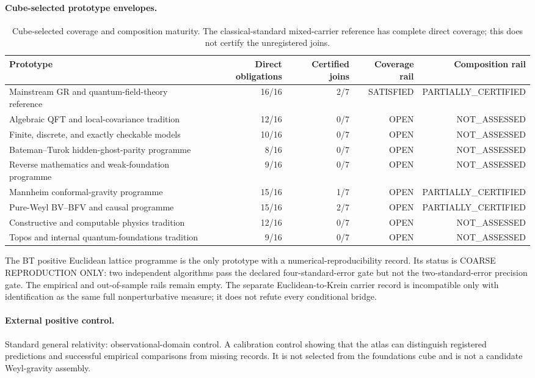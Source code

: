 \paragraph{Cube-selected prototype envelopes.}
\begin{table}[htbp]
\centering
\scriptsize
\begin{tabularx}{\textwidth}{@{}Yrrrr@{}}
\toprule
Prototype & Direct obligations & Certified joins & Coverage rail & Composition rail \\
\midrule
Mainstream GR and quantum-field-theory reference & 16/16 & 2/7 & SATISFIED & PARTIALLY\_CERTIFIED \\
Algebraic QFT and local-covariance tradition & 12/16 & 0/7 & OPEN & NOT\_ASSESSED \\
Finite, discrete, and exactly checkable models & 10/16 & 0/7 & OPEN & NOT\_ASSESSED \\
Bateman--Turok hidden-ghost-parity programme & 8/16 & 0/7 & OPEN & NOT\_ASSESSED \\
Reverse mathematics and weak-foundation programme & 9/16 & 0/7 & OPEN & NOT\_ASSESSED \\
Mannheim conformal-gravity programme & 15/16 & 1/7 & OPEN & PARTIALLY\_CERTIFIED \\
Pure-Weyl BV--BFV and causal programme & 15/16 & 2/7 & OPEN & PARTIALLY\_CERTIFIED \\
Constructive and computable physics tradition & 12/16 & 0/7 & OPEN & NOT\_ASSESSED \\
Topos and internal quantum-foundations tradition & 9/16 & 0/7 & OPEN & NOT\_ASSESSED \\
\bottomrule
\end{tabularx}
\caption{Cube-selected coverage and composition maturity.  The classical-standard mixed-carrier reference has complete direct coverage; this does not certify the unregistered joins.}
\label{tab:assembly-maturity}
\end{table}

The BT positive Euclidean lattice programme is the only prototype with a numerical-reproducibility record.  Its status is COARSE REPRODUCTION ONLY: two independent algorithms pass the declared four-standard-error gate but not the two-standard-error precision gate.  The empirical and out-of-sample rails remain empty.  The separate Euclidean-to-Krein carrier record is incompatible only with identification as the same full nonperturbative measure; it does not refute every conditional bridge.

\paragraph{External positive control.}
Standard general relativity: observational-domain control. A calibration control showing that the atlas can distinguish registered predictions and successful empirical comparisons from missing records. It is not selected from the foundations cube and is not a candidate Weyl-gravity assembly.

